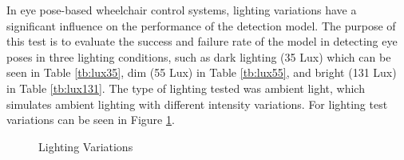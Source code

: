 In eye pose-based wheelchair control systems, lighting variations have a significant influence on the performance of the detection model. The purpose of this test is to evaluate the success and failure rate of the model in detecting eye poses in three lighting conditions, such as dark lighting (35 Lux) which can be seen in Table \ref{tb:lux35}, dim (55 Lux) in Table \ref{tb:lux55}, and bright (131 Lux) in Table \ref{tb:lux131}. The type of lighting tested was ambient light, which simulates ambient lighting with different intensity variations. For lighting test variations can be seen in Figure \ref{fig:Variasi Pencahayaan}.

\begin{figure}[H]
  \centering
  \hfil


  \caption{Lighting Variations}
  \label{fig:Variasi Pencahayaan}
\end{figure}

